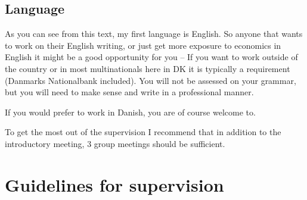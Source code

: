\documentclass[
]{book}
\begin{document}
\hypertarget{language}{%
\section{Language}\label{language}}

As you can see from this text, my first language is English. So anyone
that wants to work on their English writing, or just get more exposure
to economics in English it might be a good opportunity for you -- If you
want to work outside of the country or in most multinationals here in DK
it is typically a requirement (Danmarks Nationalbank included). You will
not be assessed on your grammar, but you will need to make sense and
write in a professional manner.

If you would prefer to work in Danish, you are of course welcome to.

To get the most out of the supervision I recommend that in addition to
the introductory meeting, 3 group meetings should be sufficient.

\hypertarget{guidelines-for-supervision}{%
\chapter{Guidelines for supervision}\label{guidelines-for-supervision}}
\end{document}
